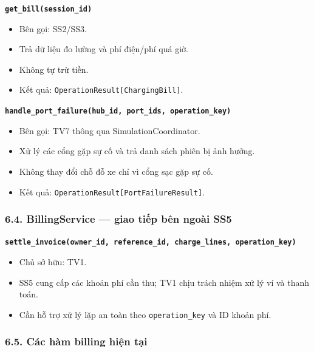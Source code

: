 \documentclass[11pt,a4paper]{article}
\providecommand{\tightlist}{%
  \setlength{\itemsep}{0pt}\setlength{\parskip}{0pt}}
\begin{document}
\textbf{\texttt{get\_bill(session\_id)}}

\begin{itemize}
\tightlist
\item
  Bên gọi: SS2/SS3.
\item
  Trả dữ liệu đo lường và phí điện/phí quá giờ.
\item
  Không tự trừ tiền.
\item
  Kết quả: \texttt{OperationResult{[}ChargingBill{]}}.
\end{itemize}

\textbf{\texttt{handle\_port\_failure(hub\_id,\ port\_ids,\ operation\_key)}}

\begin{itemize}
\tightlist
\item
  Bên gọi: TV7 thông qua SimulationCoordinator.
\item
  Xử lý các cổng gặp sự cố và trả danh sách phiên bị ảnh hưởng.
\item
  Không thay đổi chỗ đỗ xe chỉ vì cổng sạc gặp sự cố.
\item
  Kết quả: \texttt{OperationResult{[}PortFailureResult{]}}.
\end{itemize}

\hypertarget{billingservice-giao-tiux1ebfp-buxean-ngouxe0i-ss5}{%
\subsubsection{6.4. BillingService --- giao tiếp bên ngoài
SS5}\label{billingservice-giao-tiux1ebfp-buxean-ngouxe0i-ss5}}

\textbf{\texttt{settle\_invoice(owner\_id,\ reference\_id,\ charge\_lines,\ operation\_key)}}

\begin{itemize}
\tightlist
\item
  Chủ sở hữu: TV1.
\item
  SS5 cung cấp các khoản phí cần thu; TV1 chịu trách nhiệm xử lý ví và
  thanh toán.
\item
  Cần hỗ trợ xử lý lặp an toàn theo \texttt{operation\_key} và ID khoản
  phí.
\end{itemize}

\hypertarget{cuxe1c-huxe0m-billing-hiux1ec7n-tux1ea1i}{%
\subsubsection{6.5. Các hàm billing hiện
tại}\label{cuxe1c-huxe0m-billing-hiux1ec7n-tux1ea1i}}
\end{document}
